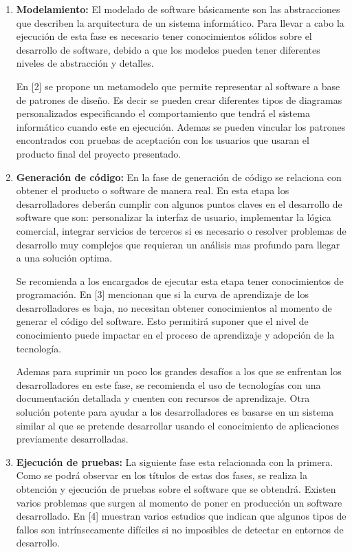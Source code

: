 \begin{enumerate}
	\item \textbf{Modelamiento: } El modelado de software básicamente son las abstracciones que describen la arquitectura de un sistema informático. Para llevar a cabo la ejecución de esta fase es necesario tener conocimientos sólidos sobre el desarrollo de software, debido a que los modelos pueden tener diferentes niveles de abstracción y detalles. 
	
	En [2] se propone un metamodelo que permite representar al software a base de patrones de diseño. Es decir se pueden crear diferentes tipos de diagramas personalizados especificando el comportamiento que tendrá el sistema informático cuando este en ejecución. Ademas se pueden vincular los patrones encontrados con pruebas de aceptación con los usuarios que usaran el producto final del proyecto presentado. 
	
	\item \textbf{Generación de código:} En la fase de generación de código se relaciona con obtener el producto o software de manera real. En esta etapa los desarrolladores deberán cumplir con algunos puntos claves en el desarrollo de software que son: personalizar la interfaz de usuario, implementar la lógica comercial, integrar servicios de terceros si es necesario o resolver problemas de desarrollo muy complejos que requieran un análisis mas profundo para llegar a una solución optima.
	
	Se recomienda a los encargados de ejecutar esta etapa tener conocimientos de programación. En [3] mencionan que si la curva de aprendizaje de los desarrolladores es baja, no necesitan obtener conocimientos al momento de generar el código del software. Esto permitirá suponer que el nivel de conocimiento puede impactar en el proceso de aprendizaje y adopción de la tecnología. 
	
	Ademas para suprimir un poco los grandes desafíos a los que se enfrentan los desarrolladores en este fase, se recomienda el uso de tecnologías con una documentación detallada y cuenten con recursos de aprendizaje. Otra solución potente para ayudar a los desarrolladores es basarse en un sistema similar al que se pretende desarrollar usando el conocimiento de aplicaciones previamente desarrolladas.  
	
	\item \textbf{Ejecución de pruebas:} La siguiente fase esta relacionada con la primera. Como se podrá observar en los títulos de estas dos fases, se realiza la obtención y ejecución de pruebas sobre el software que se obtendrá. Existen varios problemas que surgen al momento de poner en producción un software desarrollado. En [4] muestran varios estudios que indican que algunos tipos de fallos son intrínsecamente difíciles si no imposibles de detectar en entornos de desarrollo.
	

\end{enumerate}
